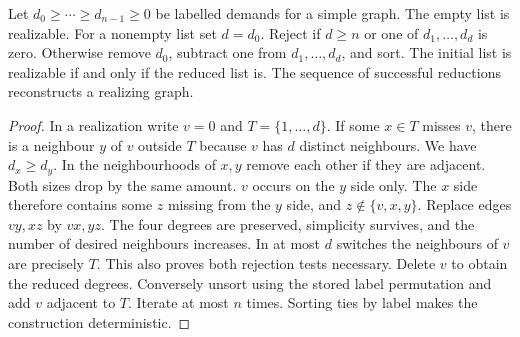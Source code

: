 \begin{theorem}\leavevmode\label{idx:elementary-havel-hakimi-realization-criterion}
Let $d_0\ge\cdots\ge d_{n-1}\ge0$ be labelled demands for a simple graph.
The empty list is realizable. For a nonempty list set $d=d_0$. Reject if
$d\ge n$ or one of $d_1,\ldots,d_d$ is zero. Otherwise remove $d_0$,
subtract one from $d_1,\ldots,d_d$, and sort. The initial list is realizable
if and only if the reduced list is. The sequence of successful reductions
reconstructs a realizing graph.
\end{theorem}
\begin{proof}
In a realization write $v=0$ and $T=\{1,\ldots,d\}$. If some $x\in T$
misses $v$, there is a neighbour $y$ of $v$ outside $T$ because $v$ has
$d$ distinct neighbours. We have $d_x\ge d_y$. In the neighbourhoods of
$x,y$ remove each other if they are adjacent. Both sizes drop by the same
amount. $v$ occurs on the $y$ side only. The $x$ side therefore contains
some $z$ missing from the $y$ side, and $z\notin\{v,x,y\}$. Replace edges
$vy,xz$ by $vx,yz$. The four degrees are preserved, simplicity survives,
and the number of desired neighbours increases. In at most $d$ switches the
neighbours of $v$ are precisely $T$. This also proves both rejection tests
necessary. Delete $v$ to obtain the reduced degrees. Conversely unsort using
the stored label permutation and add $v$ adjacent to $T$. Iterate at most
$n$ times. Sorting ties by label makes the construction deterministic.
\end{proof}

